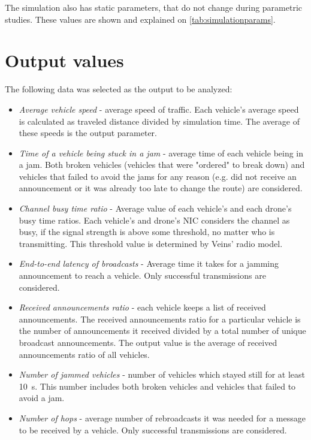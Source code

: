 \documentclass[]{nsm-thesis}
\begin{document}
The simulation also has static parameters, that do not change during parametric studies. These values  are shown and explained on \cref{tab:simulationparams}.

\section{Output values}

The following data was selected as the output to be analyzed:

\begin{itemize}

	\item \emph{Average vehicle speed} - average speed of traffic. Each vehicle's average speed is calculated as traveled distance divided by simulation time. The average of these speeds is the output parameter.
	
	\item \emph{Time of a vehicle being stuck in a jam} - average time of each vehicle being in a jam. Both broken vehicles (vehicles that were "ordered" to break down) and vehicles that failed to avoid the jams for any reason (e.g. did not receive an announcement or it was already too late to change the route) are considered.
	
	\item \emph{Channel busy time ratio} - Average value of each vehicle's and each drone's busy time ratios. Each vehicle's and drone's \ac{NIC} considers the channel as busy, if the signal strength is above some threshold, no matter who is transmitting. This threshold value is determined by Veins' radio model.

	\item \emph{End-to-end latency of broadcasts} - Average time it takes for a jamming announcement to reach a vehicle. Only successful transmissions are considered.

	\item \emph{Received announcements ratio} - each vehicle keeps a list of received announcements. The received announcements ratio for a particular vehicle is the number of announcements it received divided by a total number of unique broadcast announcements. The output value is the average of received announcements ratio of all vehicles.

	\item \emph{Number of jammed vehicles} - number of vehicles which stayed still for at least \SI{10}{\second}. This number includes both broken vehicles and vehicles that failed to avoid a jam.

	\item \emph{Number of hops} - average number of rebroadcasts it was needed for a message to be received by a vehicle. Only successful transmissions are considered.

\end{itemize}
\end{document}
